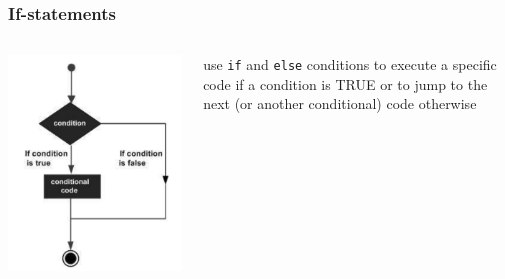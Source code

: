 \documentclass{beamer}
\begin{document}
\begin{frame}
\frametitle{If-statements}
	\begin{columns}[T]
	\begin{column}[T]{5cm}
			\includegraphics[width = 1\textwidth]{DecisionMaking.pdf}
		\end{column}
		\begin{column}[T]{3cm}
			use \texttt{if} and \texttt{else} conditions to execute a specific code if a condition is TRUE or to jump to the next (or another conditional) code otherwise	
		\end{column}	
	\end{columns}
\end{frame}
\end{document}
